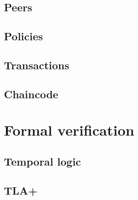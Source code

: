 \documentclass[english, biblatex, digitaloutput]{kththesis}
\begin{document}
\subsection{Peers}

\subsection{Policies}

\subsection{Transactions}

\subsection{Chaincode}


\section{Formal verification}

\subsection{Temporal logic}

\subsection{TLA+}



\end{document}
